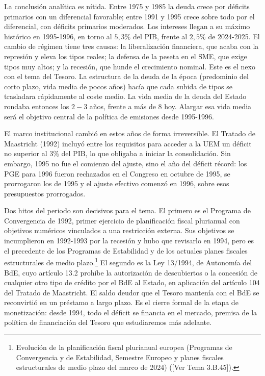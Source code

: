 \documentclass[10pt,a4paper]{article}
\newcommand{\authorfont}[1]{{\fontfamily{EBGaramond-TLF}\selectfont #1}}
\begin{document}
La conclusión analítica es nítida. Entre 1975 y 1985 la deuda crece por déficits primarios con un diferencial favorable; entre 1991 y 1995 crece sobre todo por el diferencial, con déficits primarios moderados. Los intereses llegan a su máximo histórico en 1995-1996, en torno al $5,3\%$ del PIB, frente al $2,5\%$ de 2024-2025. El cambio de régimen tiene tres causas: la liberalización financiera, que acaba con la represión y eleva los tipos reales; la defensa de la peseta en el SME, que exige tipos muy altos; y la recesión, que hunde el crecimiento nominal. Este es el nexo con el tema del Tesoro. La estructura de la deuda de la época (predominio del corto plazo, vida media de pocos años) hacía que cada subida de tipos se trasladara rápidamente al coste medio. La vida media de la deuda del Estado rondaba entonces los $2-3$ años, frente a más de $8$ hoy. Alargar esa vida media será el objetivo central de la política de emisiones desde 1995-1996.

El marco institucional cambió en estos años de forma irreversible. El Tratado de Maastricht (1992) incluyó entre los requisitos para acceder a la UEM un déficit no superior al $3\%$ del PIB, lo que obligaba a iniciar la consolidación. Sin embargo, 1995 no fue el comienzo del ajuste, sino el año del déficit récord: los PGE para 1996 fueron rechazados en el Congreso en octubre de 1995, se prorrogaron los de 1995 y el ajuste efectivo comenzó en 1996, sobre esos presupuestos prorrogados.

Dos hitos del periodo son decisivos para el tema. El primero es el Programa de Convergencia de 1992, primer ejercicio de planificación fiscal plurianual con objetivos numéricos vinculados a una restricción externa. Sus objetivos se incumplieron en 1992-1993 por la recesión y hubo que revisarlo en 1994, pero es el precedente de los Programas de Estabilidad y de los actuales planes fiscales estructurales de medio plazo.\footnote{Evolución de la planificación fiscal plurianual europea (Programas de Convergencia y de Estabilidad, Semestre Europeo y planes fiscales estructurales de medio plazo del marco de 2024) ([\authorfont{Ver Tema 3.B.45}]).
} El segundo es la Ley 13/1994, de Autonomía del BdE, cuyo artículo 13.2 prohíbe la autorización de descubiertos o la concesión de cualquier otro tipo de crédito por el BdE al Estado, en aplicación del artículo 104 del Tratado de Maastricht. El saldo deudor que el Tesoro mantenía con el BdE se reconvirtió en un préstamo a largo plazo. Es el cierre formal de la etapa de monetización: desde 1994, todo el déficit se financia en el mercado, premisa de la política de financiación del Tesoro que estudiaremos más adelante.
\end{document}
